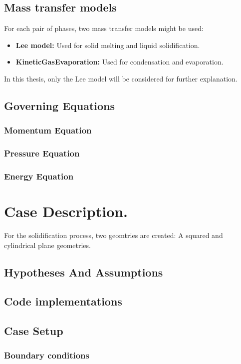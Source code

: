 \subsection{Mass transfer models}
For each pair of phases, two mass transfer models might be used:
\begin{itemize}
	\item \textbf{Lee model:} Used for solid melting and liquid solidification.
	\item \textbf{KineticGasEvaporation:} Used for condensation and evaporation.
\end{itemize}
In this thesis, only the Lee model will be considered for further explanation.




\subsection{Governing Equations}

\subsubsection{Momentum Equation}
\subsubsection{Pressure Equation}
\subsubsection{Energy Equation}

\section{Case Description.}
For the solidification process, two geomtries are created: A squared and cylindrical plane geometries. 

\subsection{Hypotheses And Assumptions}
\subsection{Code implementations}
\subsection{Case Setup}
\subsubsection*{Boundary conditions}

